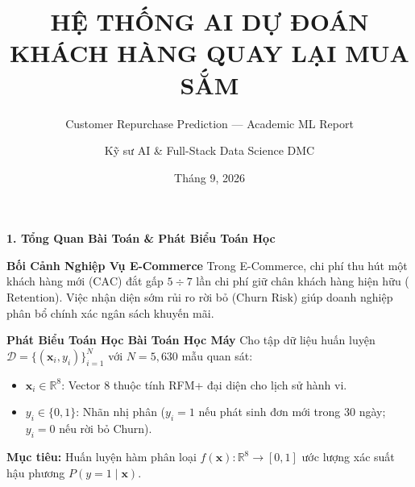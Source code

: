 \documentclass[10pt, aspectratio=169]{beamer}
\title{\textbf{HỆ THỐNG AI DỰ ĐOÁN KHÁCH HÀNG QUAY LẠI MUA SẮM}}
\subtitle{Customer Repurchase Prediction — Academic ML Report}
\author{Kỹ sư AI \& Full-Stack Data Science DMC}
\institute{DMC AI Laboratory --- E-Commerce Analytics}
\date{Tháng 9, 2026}
\begin{document}
\begin{frame}
    \titlepage
\end{frame}

\begin{frame}{\textbf{1. Tổng Quan Bài Toán \& Phát Biểu Toán Học}}
    \begin{block}{\textbf{Bối Cảnh Nghiệp Vụ E-Commerce}}
        Trong E-Commerce, chi phí thu hút một khách hàng mới ($\text{CAC}$) đắt gấp $5 \div 7$ lần chi phí giữ chân khách hàng hiện hữu ($\text{Retention}$). Việc nhận diện sớm rủi ro rời bỏ ($\text{Churn Risk}$) giúp doanh nghiệp phân bổ chính xác ngân sách khuyến mãi.
    \end{block}

    \vspace{0.2cm}
    \begin{block}{\textbf{Phát Biểu Toán Học Bài Toán Học Máy}}
        Cho tập dữ liệu huấn luyện $\mathcal{D} = \{(\mathbf{x}_i, y_i)\}_{i=1}^N$ với $N = 5,630$ mẫu quan sát:
        \begin{itemize}
            \item $\mathbf{x}_i \in \mathbb{R}^8$: Vector $8$ thuộc tính RFM+ đại diện cho lịch sử hành vi.
            \item $y_i \in \{0, 1\}$: Nhãn nhị phân ($y_i = 1$ nếu phát sinh đơn mới trong 30 ngày; $y_i = 0$ nếu rời bỏ Churn).
        \end{itemize}
        \textbf{Mục tiêu:} Huấn luyện hàm phân loại $f(\mathbf{x}): \mathbb{R}^8 \to [0, 1]$ ước lượng xác suất hậu phương $P(y = 1 \mid \mathbf{x})$.
    \end{block}
\end{frame}
\end{document}
